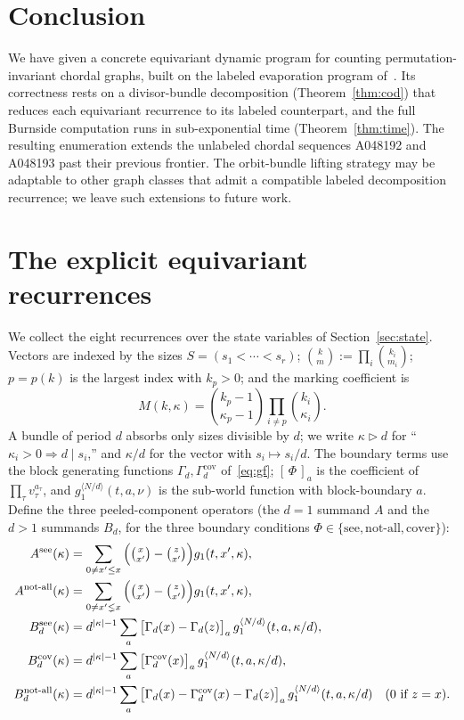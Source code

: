 \documentclass[11pt]{article}
\theoremstyle{plain}
\theoremstyle{definition}
\begin{document}
\section{Conclusion}

We have given a concrete equivariant dynamic program for counting permutation-invariant chordal
graphs, built on the labeled evaporation program of~\cite{HLV2023}. Its correctness rests on a
divisor-bundle decomposition (Theorem~\ref{thm:cod}) that reduces each equivariant recurrence to its
labeled counterpart, and the full Burnside computation runs in sub-exponential time
(Theorem~\ref{thm:time}). The resulting enumeration extends the unlabeled chordal sequences A048192
and A048193 past their previous frontier. The orbit-bundle lifting strategy may be adaptable to other
graph classes that admit a compatible labeled decomposition recurrence; we leave such extensions to
future work.

\appendix

\section{The explicit equivariant recurrences}\label{app:rec}

We collect the eight recurrences over the state variables of Section~\ref{sec:state}. Vectors are
indexed by the sizes $S=(s_1<\cdots<s_r)$; $\binom{k}{m}:=\prod_i\binom{k_i}{m_i}$; $p=p(k)$ is the
largest index with $k_p>0$; and the marking coefficient is
\[
M(k,\kappa)=\binom{k_p-1}{\kappa_p-1}\prod_{i\ne p}\binom{k_i}{\kappa_i}.
\]
A bundle of period $d$ absorbs only sizes divisible by $d$; we write $\kappa\rhd d$ for ``$\kappa_i>0
\Rightarrow d\mid s_i$,'' and $\kappa/d$ for the vector with $s_i\mapsto s_i/d$. The boundary terms use
the block generating functions $\Gamma_d,\Gamma_d^{\mathrm{cov}}$ of~\eqref{eq:gf}; $[\,\Phi\,]_a$ is
the coefficient of $\prod_\tau v_\tau^{a_\tau}$, and $g_1^{\langle N/d\rangle}(t,a,\nu)$ is the
sub-world function with block-boundary $a$. Define the three peeled-component operators
(the $d=1$ summand $A$ and the $d>1$ summands $B_d$, for the three boundary conditions
$\Phi\in\{\mathrm{see},\mathrm{not\text{-}all},\mathrm{cover}\}$):
\begin{align*}
A^{\mathrm{see}}(\kappa)&=\sum_{0\ne x'\le x}\Big(\tbinom{x}{x'}-\tbinom{z}{x'}\Big)g_1(t,x',\kappa),\\
A^{\mathrm{not\text{-}all}}(\kappa)&=\sum_{0\ne x'\lneq x}\Big(\tbinom{x}{x'}-\tbinom{z}{x'}\Big)g_1(t,x',\kappa),\\
B_d^{\mathrm{see}}(\kappa)&=d^{|\kappa|-1}\sum_{a}\big[\Gamma_d(x)-\Gamma_d(z)\big]_a\,g_1^{\langle N/d\rangle}(t,a,\kappa/d),\\
B_d^{\mathrm{cov}}(\kappa)&=d^{|\kappa|-1}\sum_{a}\big[\Gamma_d^{\mathrm{cov}}(x)\big]_a\,g_1^{\langle N/d\rangle}(t,a,\kappa/d),\\
B_d^{\mathrm{not\text{-}all}}(\kappa)&=d^{|\kappa|-1}\sum_{a}\big[\Gamma_d(x)-\Gamma_d^{\mathrm{cov}}(x)-\Gamma_d(z)\big]_a\,g_1^{\langle N/d\rangle}(t,a,\kappa/d)\quad(0\text{ if }z=x).
\end{align*}
\end{document}
